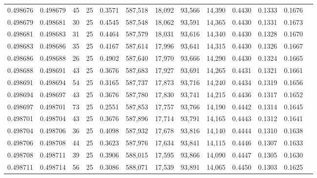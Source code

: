 \begin{tabular}{rrrrrrrrrrrrr}
0.498676 & 0.498679 &    45 &  25 &                                     0.3571 & 587,518 &  18,092 &  93,566 &  14,390 & 0.4430 & 0.1333 & 0.1676 \\
0.498679 & 0.498681 &    30 &  25 &                                     0.4545 & 587,548 &  18,062 &  93,591 &  14,365 & 0.4430 & 0.1331 & 0.1673 \\
0.498681 & 0.498683 &    31 &  25 &                                     0.4464 & 587,579 &  18,031 &  93,616 &  14,340 & 0.4430 & 0.1328 & 0.1670 \\
0.498683 & 0.498686 &    35 &  25 &                                     0.4167 & 587,614 &  17,996 &  93,641 &  14,315 & 0.4430 & 0.1326 & 0.1667 \\
0.498686 & 0.498688 &    26 &  25 &                                     0.4902 & 587,640 &  17,970 &  93,666 &  14,290 & 0.4430 & 0.1324 & 0.1665 \\
0.498688 & 0.498691 &    43 &  25 &                                     0.3676 & 587,683 &  17,927 &  93,691 &  14,265 & 0.4431 & 0.1321 & 0.1661 \\
0.498691 & 0.498694 &    54 &  25 &                                     0.3165 & 587,737 &  17,873 &  93,716 &  14,240 & 0.4434 & 0.1319 & 0.1656 \\
0.498694 & 0.498697 &    43 &  25 &                                     0.3676 & 587,780 &  17,830 &  93,741 &  14,215 & 0.4436 & 0.1317 & 0.1652 \\
0.498697 & 0.498701 &    73 &  25 &                                     0.2551 & 587,853 &  17,757 &  93,766 &  14,190 & 0.4442 & 0.1314 & 0.1645 \\
0.498701 & 0.498704 &    43 &  25 &                                     0.3676 & 587,896 &  17,714 &  93,791 &  14,165 & 0.4443 & 0.1312 & 0.1641 \\
0.498704 & 0.498706 &    36 &  25 &                                     0.4098 & 587,932 &  17,678 &  93,816 &  14,140 & 0.4444 & 0.1310 & 0.1638 \\
0.498706 & 0.498708 &    44 &  25 &                                     0.3623 & 587,976 &  17,634 &  93,841 &  14,115 & 0.4446 & 0.1307 & 0.1633 \\
0.498708 & 0.498711 &    39 &  25 &                                     0.3906 & 588,015 &  17,595 &  93,866 &  14,090 & 0.4447 & 0.1305 & 0.1630 \\
0.498711 & 0.498714 &    56 &  25 &                                     0.3086 & 588,071 &  17,539 &  93,891 &  14,065 & 0.4450 & 0.1303 & 0.1625 \\

\end{tabular}
